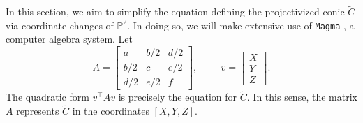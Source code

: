 \documentclass[10pt,a4paper]{amsart}
\numberwithin{equation}{section}
\numberwithin{figure}{section}
\numberwithin{table}{section}
\theoremstyle{definition}
\theoremstyle{plain}
\theoremstyle{remark}
\theoremstyle{plain}
\theoremstyle{definition}
\theoremstyle{plain}
\theoremstyle{plain}
\renewcommand{\P}{\mathbb{P}}
\newcommand{\trsp}[1]{{{#1}^{\top}\!\!}}
\begin{document}
	In this section, we aim to simplify the equation defining the projectivized conic $\widetilde{C}$ via coordinate-changes of $\P^2$. In doing so,
	we will make extensive use of \texttt{Magma} \cite{magma}, a computer 
	algebra system. Let
	\begin{equation*}
	A=\begin{bmatrix}
	a&b/2&d/2\\
	b/2&c&e/2\\
	d/2&e/2&f
	\end{bmatrix}, \hspace{1cm}
	v = \begin{bmatrix}
	X\\
	Y\\
	Z
	\end{bmatrix}.
	\end{equation*}
	The quadratic form $\trsp{v} A v$ is precisely the equation for $\widetilde{C}$. In this sense, the matrix $A$ represents $\widetilde{C}$ in the coordinates $[X,Y,Z]$.
	
\end{document}
